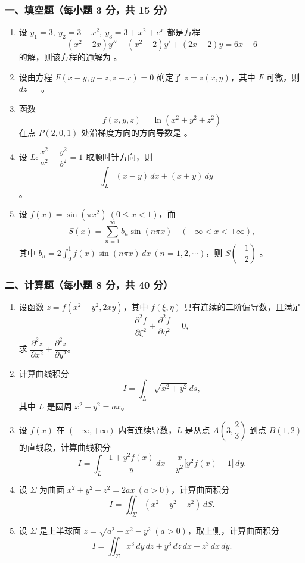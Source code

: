 \subsubsection*{一、填空题（每小题 3 分，共 15 分）}
\begin{enumerate}
  \item 设 $y_1=3,\ y_2=3+x^2,\ y_3=3+x^2+e^x$ 都是方程
  \[
  (x^2-2x)y''-(x^2-2)y'+(2x-2)y=6x-6
  \]
  的解，则该方程的通解为 \underline{\hspace{4cm}}。
  \item 设由方程 $F(x-y,y-z,z-x)=0$ 确定了 $z=z(x,y)$，其中 $F$ 可微，则 $dz=$ \underline{\hspace{3cm}}。
  \item 函数
  \[
    f(x,y,z)=\ln(x^2+y^2+z^2)
  \]
  在点 $P(2,0,1)$ 处沿梯度方向的方向导数是 \underline{\hspace{4cm}}。
  \item 设 $L:\dfrac{x^2}{a^2}+\dfrac{y^2}{b^2}=1$ 取顺时针方向，则
  \[
  \int_L(x-y)\,dx+(x+y)\,dy=
  \]
  \underline{\hspace{3cm}}。
  \item 设 $f(x)=\sin(\pi x^2)\ (0\le x<1)$，而
  \[
  S(x)=\sum_{n=1}^{\infty}b_n\sin(n\pi x)\quad(-\infty<x<+\infty),
  \]
  其中 $b_n=2\int_0^1 f(x)\sin(n\pi x)\,dx\ (n=1,2,\cdots)$，则 $S\!\left(-\dfrac12\right)$ \underline{\hspace{3cm}}。
\end{enumerate}

\subsubsection*{二、计算题（每小题 8 分，共 40 分）}
\begin{enumerate}
  \item 设函数 $z=f(x^2-y^2,2xy)$，其中 $f(\xi,\eta)$ 具有连续的二阶偏导数，且满足
  \[
  \frac{\partial^2 f}{\partial \xi^2}+\frac{\partial^2 f}{\partial \eta^2}=0,
  \]
  求 $\dfrac{\partial^2 z}{\partial x^2}+\dfrac{\partial^2 z}{\partial y^2}$。
  \item 计算曲线积分
  \[
  I=\int_L\sqrt{x^2+y^2}\,ds,
  \]
  其中 $L$ 是圆周 $x^2+y^2=ax$。
  \item 设 $f(x)$ 在 $(-\infty,+\infty)$ 内有连续导数，$L$ 是从点 $A\!\left(3,\dfrac23\right)$ 到点 $B(1,2)$ 的直线段，计算曲线积分
  \[
  I=\int_L\frac{1+y^2f(x)}{y}\,dx+\frac{x}{y^2}\bigl[y^2f(x)-1\bigr]\,dy.
  \]
  \item 设 $\Sigma$ 为曲面 $x^2+y^2+z^2=2ax\ (a>0)$，计算曲面积分
  \[
  I=\iint_\Sigma (x^2+y^2+z^2)\,dS.
  \]
  \item 设 $\Sigma$ 是上半球面 $z=\sqrt{a^2-x^2-y^2}\ (a>0)$，取上侧，计算曲面积分
  \[
  I=\iint_\Sigma x^3\,dy\,dz+y^3\,dz\,dx+z^3\,dx\,dy.
  \]
\end{enumerate}

